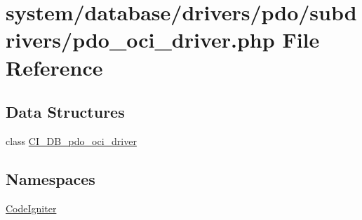 \hypertarget{pdo__oci__driver_8php}{}\section{system/database/drivers/pdo/subdrivers/pdo\+\_\+oci\+\_\+driver.php File Reference}
\label{pdo__oci__driver_8php}
\subsection*{Data Structures}
\begin{DoxyCompactItemize}
\item 
class \mbox{\hyperlink{class_c_i___d_b__pdo__oci__driver}{C\+I\+\_\+\+D\+B\+\_\+pdo\+\_\+oci\+\_\+driver}}
\end{DoxyCompactItemize}
\subsection*{Namespaces}
\begin{DoxyCompactItemize}
\item 
 \mbox{\hyperlink{namespace_code_igniter}{Code\+Igniter}}
\end{DoxyCompactItemize}
